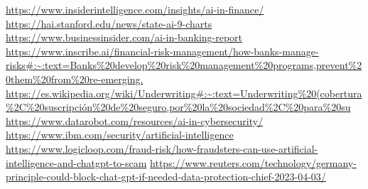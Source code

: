 \documentclass[12pt, a4paper]{report}
\begin{document}
\begin{thebibliography}{9}
	\url{https://www.insiderintelligence.com/insights/ai-in-finance/}
	\url{https://hai.stanford.edu/news/state-ai-9-charts}
	\url{https://www.businessinsider.com/ai-in-banking-report}
	\url{https://www.inscribe.ai/financial-risk-management/how-banks-manage-risks#:~:text=Banks%20develop%20risk%20management%20programs,prevent%20them%20from%20re-emerging.}
	\url{https://es.wikipedia.org/wiki/Underwriting#:~:text=Underwriting%20(cobertura%2C%20suscripción%20de%20seguro,por%20la%20sociedad%2C%20para%20su}
	\url{https://www.datarobot.com/resources/ai-in-cybersecurity/}
	\url{https://www.ibm.com/security/artificial-intelligence}
	\url{https://www.logicloop.com/fraud-risk/how-fraudsters-can-use-artificial-intelligence-and-chatgpt-to-scam}
	\url{https://www.reuters.com/technology/germany-principle-could-block-chat-gpt-if-needed-data-protection-chief-2023-04-03/}
	
\end{thebibliography}
\end{document}
